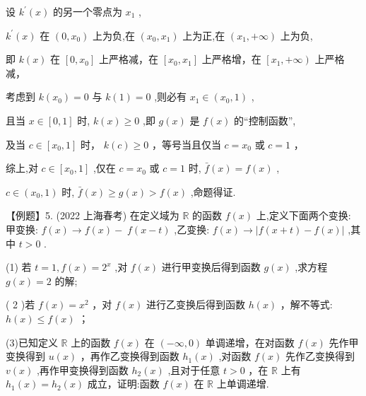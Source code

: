 \documentclass[10pt]{article}
\begin{document}
设 \({k}^{\prime }\left( x\right)\) 的另一个零点为 \({x}_{1}\) ,

\({k}^{\prime }\left( x\right)\) 在 \(\left( {0,{x}_{0}}\right)\) 上为负,在 \(\left( {{x}_{0},{x}_{1}}\right)\) 上为正,在 \(\left( {{x}_{1}, + \infty }\right)\) 上为负,

即 \(k\left( x\right)\) 在 \(\left\lbrack  {0,{x}_{0}}\right\rbrack\) 上严格减，在 \(\left\lbrack  {{x}_{0},{x}_{1}}\right\rbrack\) 上严格增，在 \(\left\lbrack  {{x}_{1}, + \infty }\right)\) 上严格减，

考虑到 \(k\left( {x}_{0}\right)  = 0\) 与 \(k\left( 1\right)  = 0\) ,则必有 \({x}_{1} \in  \left( {{x}_{0},1}\right)\) ,

且当 \(x \in  \left\lbrack  {0,1}\right\rbrack\) 时, \(k\left( x\right)  \geq  0\) ,即 \(g\left( x\right)\) 是 \(f\left( x\right)\) 的“控制函数”,

及当 \(c \in  \left\lbrack  {{x}_{0},1}\right\rbrack\) 时， \(k\left( c\right)  \geq  0\) ，等号当且仅当 \(c = {x}_{0}\) 或 \(c = 1\) ，

综上,对 \(c \in  \left\lbrack  {{x}_{0},1}\right\rbrack\) ,仅在 \(c = {x}_{0}\) 或 \(c = 1\) 时, \(\bar{f}\left( x\right)  = f\left( x\right)\) ,

\(c \in  \left( {{x}_{0},1}\right)\) 时, \(\bar{f}\left( x\right)  \geq  g\left( x\right)  > f\left( x\right)\) ,命题得证.

【例题】5. (2022 上海春考) 在定义域为 \(\mathbb{R}\) 的函数 \(f\left( x\right)\) 上,定义下面两个变换: 甲变换: \(f\left( x\right)  \rightarrow  f\left( x\right)  - \; f\left( {x - t}\right)\) ,乙变换: \(f\left( x\right)  \rightarrow  \left| {f\left( {x + t}\right)  - f\left( x\right) }\right|\) ,其中 \(t > 0\) .

(1) 若 \(t = 1,f\left( x\right)  = {2}^{x}\) ,对 \(f\left( x\right)\) 进行甲变换后得到函数 \(g\left( x\right)\) ,求方程 \(g\left( x\right)  = 2\) 的解;

( 2 )若 \(f\left( x\right)  = {x}^{2}\) ，对 \(f\left( x\right)\) 进行乙变换后得到函数 \(h\left( x\right)\) ，解不等式: \(h\left( x\right)  \leq  f\left( x\right)\) ；

(3)已知定义 \(\mathbb{R}\) 上的函数 \(f\left( x\right)\) 在 \(\left( {-\infty ,0}\right)\) 单调递增，在对函数 \(f\left( x\right)\) 先作甲变换得到 \(u\left( x\right)\) ，再作乙变换得到函数 \({h}_{1}\left( x\right)\) ,对函数 \(f\left( x\right)\) 先作乙变换得到 \(v\left( x\right)\) ,再作甲变换得到函数 \({h}_{2}\left( x\right)\) ,且对于任意 \(t > 0\) ，在 \(\mathbb{R}\) 上有 \({h}_{1}\left( x\right)  = {h}_{2}\left( x\right)\) 成立，证明:函数 \(f\left( x\right)\) 在 \(\mathbb{R}\) 上单调递增.
\end{document}
